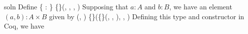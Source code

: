 soln Define
      \{ : \} \{\}(, , , )
Supposing that $a : A$ and $b : B$, we have an element $(a, b) : A \times B$
given by
  (, )  \{\}(\{\}(, , ), , )
Defining this type and constructor in Coq, we have


